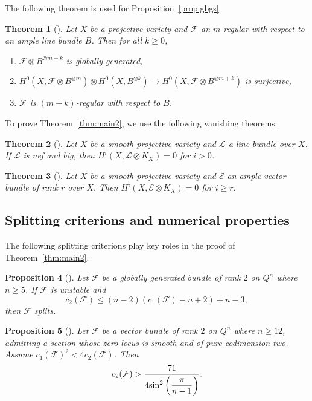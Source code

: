 \documentclass{amsproc}
\newtheorem{theorem}{Theorem}[section]
\newtheorem{proposition}[theorem]{Proposition}
\theoremstyle{definition}
\def\cE{{\mathcal E}}
\def\cF{{\mathcal F}}
\def\cL{{\mathcal L}}
\def\ra{\rightarrow}
\def\tensor{\otimes}
\begin{document}
The following theorem is used for Proposition~\ref{prop:gbgs}. 
\begin{theorem}[{\cite[Theorem~1.8.5]{L041}}]\label{thm:mreg}
Let $X$ be a projective variety and $\cF$ an $m$-regular with respect to an ample line bundle $B$. Then for all $k\ge 0$, 
\begin{enumerate}
\item $\cF\tensor B^{\tensor m+k}$ is globally generated, 
\item $H^0(X, \cF\tensor B^{\tensor m}) \tensor H^0(X, B^{\tensor k}) \ra H^0(X, \cF\tensor B^{\tensor m+k})$ is surjective, 
\item $\cF$ is $(m+k)$-regular with respect to $B$.
\end{enumerate}
\end{theorem}
To prove Theorem~\ref{thm:main2}, we use the following vanishing theorems.
\begin{theorem}[{\cite[Theorem~1]{V82}}]\label{thm:KV-van}
Let $X$ be a smooth projective variety and $\cL$ a line bundle over $X$. If $\cL$ is nef and big, then $H^i(X, \cL\tensor K_X)=0$ for $i >0$.
\end{theorem}

\begin{theorem}[{\cite[Theorem~1]{L75}}]\label{thm:le}
Let $X$ be a smooth projective variety and $\cE$ an ample vector bundle of rank $r$ over $X$. Then $H^i(X, \cE\tensor K_X)=0$ for $i \ge r$.
\end{theorem}

\subsection{Splitting criterions and numerical properties}

The following splitting criterions play key roles in the proof of Theorem~\ref{thm:main2}. 
\begin{proposition}[{\cite[Corollary~4.3]{APW94}}]\label{lem:unsta-chern}
Let $\cF$ be a globally generated bundle of rank $2$ on $Q^n$ where $n\ge 5$. If $\cF$ is unstable and 
$$
c_2(\cF) \le (n-2)(c_1(\cF)-n+2)+n-3, 
$$
then $\cF$ splits.
\end{proposition}

\begin{proposition}[{\cite[Proposition~6.2]{APW94}}]\label{lem:12sin}
Let $\cF$ be a vector bundle of rank $2$ on $Q^n$ where $n\ge 12$, admitting a section whose zero locus is smooth and of pure codimension two. Assume $c_1(\cF)^2<4c_2(\cF)$. Then
$$
c_2(\cF)>\displaystyle\frac{71}{4{\rm sin}^2\left(\displaystyle\frac{\pi}{n-1}\right)}.
$$
\end{proposition}
\end{document}
